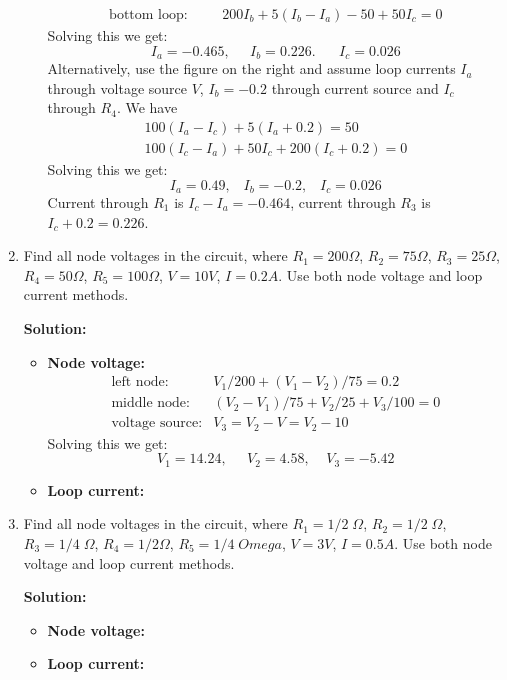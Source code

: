 \begin{enumerate}
\begin{itemize}
\[\begin{array}{ll}
	\mbox{bottom loop:}\;\;\;\;\;\;& 200I_b+5(I_b-I_a)-50+50I_c=0 \end{array} \]
      Solving this we get:
      \[ I_a=-0.465,\;\;\;\;\;I_b=0.226.\;\;\;\;\;\;I_c=0.026 \]
      Alternatively, use the figure on the right and assume loop currents $I_a$ 
      through voltage source $V$, $I_b=-0.2$ through current source and $I_c$ through
      $R_4$. We have
      \[ \begin{array}{ll}
	100(I_a-I_c)+5(I_a+0.2)=50 \\
	100(I_c-I_a)+50I_c+200(I_c+0.2)=0 \end{array} \]
      Solving this we get:
      \[ I_a=0.49,\;\;\;I_b=-0.2,\;\;\;I_c=0.026 \]
      Current through $R_1$ is $I_c-I_a=-0.464$, current through $R_3$ is
      $I_c+0.2=0.226$.
  \end{itemize}




\item Find all node voltages in the circuit, where $R_1=200\Omega$, 
  $R_2=75\Omega$, $R_3=25\Omega$, $R_4=50\Omega$, $R_5=100\Omega$,
  $V=10V$, $I=0.2A$. Use both node voltage and loop current methods.


  {\bf Solution:}
  \begin{itemize}
    \item {\bf Node voltage:}
      \[ \begin{array}{ll}
	\mbox{left node:} & V_1/200+(V_1-V_2)/75=0.2 \\
	\mbox{middle node:} & (V_2-V_1)/75+V_2/25+V_3/100=0 \\
	\mbox{voltage source:} & V_3=V_2-V=V_2-10 \end{array} \]
      Solving this we get:
      \[ V_1=14.24,\;\;\;\;\;V_2=4.58,\;\;\;\;V_3=-5.42 \]
    \item {\bf Loop current:}

  \end{itemize}

\item Find all node voltages in the circuit, where $R_1=1/2\;\Omega$, 
  $R_2=1/2\;\Omega$, $R_3=1/4\;\Omega$, $R_4=1/2\Omega$, $R_5=1/4\;Omega$,
  $V=3V$, $I=0.5A$. Use both node voltage and loop current methods.


  {\bf Solution:}
  \begin{itemize}
    \item {\bf Node voltage:}

    \item {\bf Loop current:}

  \end{itemize}


\end{enumerate}


